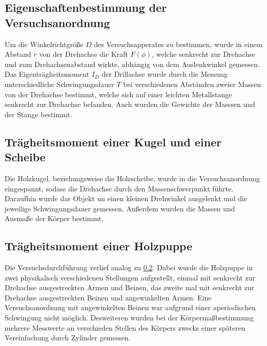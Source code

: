 \subsection{Eigenschaftenbestimmung der Versuchsanordnung}
Um die Winkelrichtgröße $D$ des Versuchsapperates zu bestimmen,
wurde in einem Abstand $r$ von der Drehachse die Kraft $F(\phi)$, 
welche senkrecht zur Drehachse und zum Drehachsenabstand wirkte, 
abhängig von dem Auslenkwinkel gemessen.\\
Das Eigenträgheitsmoment $I_D$ der Drillachse wurde durch die Messung  
unterschiedliche Schwingungsdauer $T$ bei verschiedenen Abständen
zweier Massen von der Drehachse bestimmt, welche sich auf einer 
leichten Metallstange senkrecht zur Drehachse befanden. Auch wurden die
Gewichte der Masssen und der Stange bestimmt.
\subsection{Trägheitsmoment einer Kugel und einer Scheibe} \label{subsec:KugelScheibe}
Die Holzkugel, beziehungsweise die Holzscheibe, wurde in die Versuchsanordnung
eingespannt, sodass die Drehachse durch den Massenschwerpunkt führte.
Daraufhin wurde das Objekt un einen kleinen Drehwinkel ausgelenkt und die jeweilige
Schwingungsdauer gemessen. Außerdem wurden die Massen und Ausmaße der Körper bestimmt.
 \subsection{Trägheitsmoment einer Holzpuppe} 
Die Versuchsdurchführung verlief analog zu \ref{subsec:KugelScheibe}.
Dabei wurde die Holzpuppe in zwei physikalisch verschiedenen Stellungen aufgestellt, einmal
mit senkrecht zur Drehachse ausgestreckten Armen und Beinen, das zweite mal mit  
senkrecht zur Drehachse ausgestreckten Beinen und angewinkelten Armen.
Eine Versuchsanordnung mit angewinkelten Beinen war aufgrund einer aperiodischen Schwingung
nicht möglich. Desweiteren wurden bei der Körpermaßbestimmung mehrere Messwerte an verschieden
Stellen des Körpers zwecks einer späteren Vereinfachung durch Zylinder gemessen.
